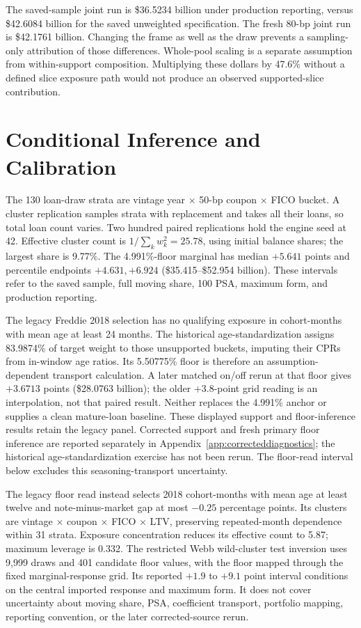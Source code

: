 

The saved-sample joint run is \$36.5234 billion under production reporting, versus \$42.6084 billion for the saved unweighted specification. The fresh 80-bp joint run is \$42.1761 billion. Changing the frame as well as the draw prevents a sampling-only attribution of those differences. Whole-pool scaling is a separate assumption from within-support composition. Multiplying these dollars by 47.6\% without a defined slice exposure path would not produce an observed supported-slice contribution.

\section{Conditional Inference and Calibration}\label{app:inference}

The 130 loan-draw strata are vintage year $\times$ 50-bp coupon $\times$ FICO bucket. A cluster replication samples strata with replacement and takes all their loans, so total loan count varies. Two hundred paired replications hold the engine seed at 42. Effective cluster count is $1/\sum_k w_k^2=25.78$, using initial balance shares; the largest share is 9.77\%. The 4.991\%-floor marginal has median $+5.641$ points and percentile endpoints $+4.631,+6.924$ (\$35.415--\$52.954 billion). These intervals refer to the saved sample, full moving share, 100 PSA, maximum form, and production reporting.



The legacy Freddie 2018 selection has no qualifying exposure in cohort-months with mean age at least 24 months. The historical age-standardization assigns 83.9874\% of target weight to those unsupported buckets, imputing their CPRs from in-window age ratios. Its 5.50775\% floor is therefore an assumption-dependent transport calculation. A later matched on/off rerun at that floor gives $+3.6713$ points (\$28.0763 billion); the older $+3.8$-point grid reading is an interpolation, not that paired result. Neither replaces the 4.991\% anchor or supplies a clean mature-loan baseline. These displayed support and floor-inference results retain the legacy panel. Corrected support and fresh primary floor inference are reported separately in Appendix~\ref{app:correcteddiagnostics}; the historical age-standardization exercise has not been rerun. The floor-read interval below excludes this seasoning-transport uncertainty.

The legacy floor read instead selects 2018 cohort-months with mean age at least twelve and note-minus-market gap at most $-0.25$ percentage points. Its clusters are vintage $\times$ coupon $\times$ FICO $\times$ LTV, preserving repeated-month dependence within 31 strata. Exposure concentration reduces its effective count to 5.87; maximum leverage is 0.332. The restricted Webb wild-cluster test inversion uses 9,999 draws and 401 candidate floor values, with the floor mapped through the fixed marginal-response grid. Its reported $+1.9$ to $+9.1$ point interval conditions on the central imported response and maximum form. It does not cover uncertainty about moving share, PSA, coefficient transport, portfolio mapping, reporting convention, or the later corrected-source rerun.

